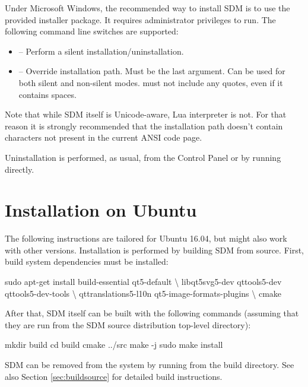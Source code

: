 \documentclass[a4paper,12pt,twoside,extrafontsizes]{memoir}
\begin{document}
Under Microsoft Windows, the recommended way to install SDM is to use the provided installer package. It requires administrator privileges to run. The following command line switches are supported:

\begin{itemize}
	\item {} -- Perform a silent installation/uninstallation.
	\item {} -- Override installation path. Must be the last argument. Can be used for both silent and non-silent modes.  must not include any quotes, even if it contains spaces.
\end{itemize}

Note that while SDM itself is Unicode-aware, Lua interpreter is not. For that reason it is strongly recommended that the installation path doesn't contain characters not present in the current ANSI code page.

Uninstallation is performed, as usual, from the Control Panel or by running  directly.

\section{Installation on Ubuntu}

The following instructions are tailored for Ubuntu 16.04, but might also work with other versions. Installation is performed by building SDM from source. First, build system dependencies must be installed:

\begin{shellcmds}
sudo apt-get install build-essential qt5-default \textbackslash
    libqt5svg5-dev qttools5-dev qttools5-dev-tools \textbackslash
    qttranslations5-l10n qt5-image-formats-plugins \textbackslash
    cmake
\end{shellcmds}

After that, SDM itself can be built with the following commands (assuming that they are run from the SDM source distribution top-level directory):

\begin{shellcmds}
mkdir build
cd build
cmake ../src
make -j
sudo make install
\end{shellcmds}

SDM can be removed from the system by running  from the build directory. See also Section \ref{sec:buildsource} for detailed build instructions.
\end{document}
